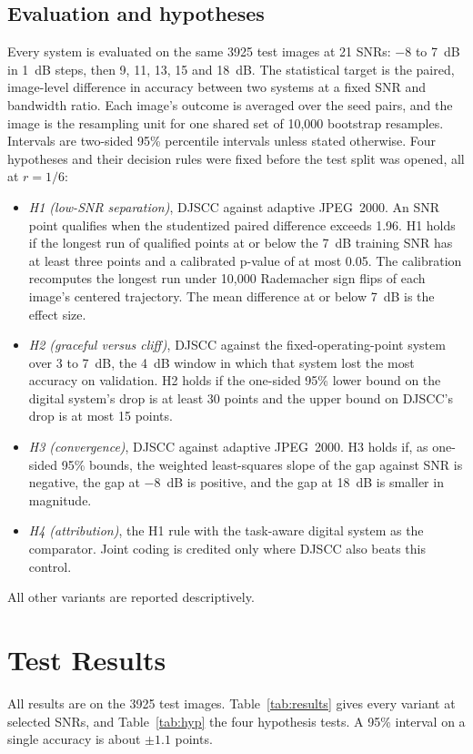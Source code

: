 \documentclass[conference]{IEEEtran}
\begin{document}
\subsection{Evaluation and hypotheses}
Every system is evaluated on the same 3925 test images at 21 SNRs: $-8$ to 7~dB in 1~dB steps, then 9, 11, 13, 15 and 18~dB. The statistical target is the paired, image-level difference in accuracy between two systems at a fixed SNR and bandwidth ratio. Each image's outcome is averaged over the seed pairs, and the image is the resampling unit for one shared set of 10,000 bootstrap resamples. Intervals are two-sided 95\% percentile intervals unless stated otherwise. Four hypotheses and their decision rules were fixed before the test split was opened, all at $r=1/6$:
\begin{itemize}
\item \emph{H1 (low-SNR separation)}, DJSCC against adaptive JPEG~2000. An SNR point qualifies when the studentized paired difference exceeds 1.96. H1 holds if the longest run of qualified points at or below the 7~dB training SNR has at least three points and a calibrated p-value of at most 0.05. The calibration recomputes the longest run under 10,000 Rademacher sign flips of each image's centered trajectory. The mean difference at or below 7~dB is the effect size.
\item \emph{H2 (graceful versus cliff)}, DJSCC against the fixed-operating-point system over 3 to 7~dB, the 4~dB window in which that system lost the most accuracy on validation. H2 holds if the one-sided 95\% lower bound on the digital system's drop is at least 30 points and the upper bound on DJSCC's drop is at most 15 points.
\item \emph{H3 (convergence)}, DJSCC against adaptive JPEG~2000. H3 holds if, as one-sided 95\% bounds, the weighted least-squares slope of the gap against SNR is negative, the gap at $-8$~dB is positive, and the gap at 18~dB is smaller in magnitude.
\item \emph{H4 (attribution)}, the H1 rule with the task-aware digital system as the comparator. Joint coding is credited only where DJSCC also beats this control.
\end{itemize}
All other variants are reported descriptively.

\section{Test Results}
All results are on the 3925 test images. Table~\ref{tab:results} gives every variant at selected SNRs, and Table~\ref{tab:hyp} the four hypothesis tests. A 95\% interval on a single accuracy is about $\pm1.1$ points.
\end{document}
